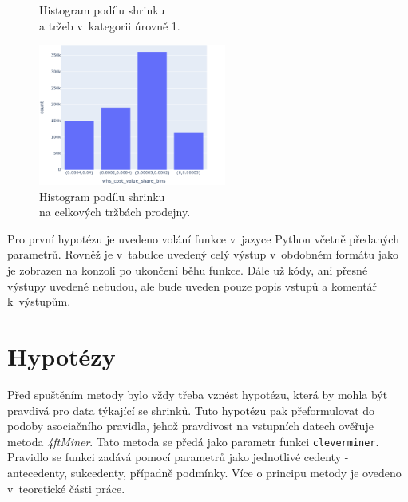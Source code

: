 \begin{figure}[h!]
\begin{minipage}[b]{.55\textwidth}
        \vspace*{-3em}
        \caption{Histogram podílu shrinku \\a tržeb v~kategorii úrovně 1.}
        \label{obr:nb:hist4}
    \end{minipage}     
       \vspace*{-1em}
\end{figure}

\begin{figure}[h!]
        \centering
        \captionsetup{justification=centering}
        \includegraphics[width=0.55\textwidth]{obrazky/grafy/histogram/newplot(4).png}
        \caption{Histogram podílu shrinku \\na celkových tržbách prodejny.}
        \label{obr:nb:hist5}
        \vspace*{-1em}
\end{figure}

Pro první hypotézu je uvedeno volání funkce v~jazyce Python včetně předaných parametrů. Rovněž je v~tabulce uvedený celý výstup v~obdobném formátu jako je zobrazen na konzoli po ukončení běhu funkce. Dále už kódy, ani přesné výstupy uvedené nebudou, ale bude uveden pouze popis vstupů a komentář k~výstupům. 

\section{Hypotézy}

Před spuštěním metody bylo vždy třeba vznést hypotézu, která by mohla být pravdivá pro data týkající se shrinků. Tuto hypotézu pak přeformulovat do podoby asociačního pravidla, jehož pravdivost  na vstupních datech ověřuje metoda \emph{4ftMiner}. Tato metoda se předá jako parametr funkci \texttt{cleverminer}. Pravidlo se funkci zadává pomocí parametrů jako jednotlivé cedenty - antecedenty, sukcedenty, případně podmínky. Více o principu metody je ovedeno v~teoretické části práce.

\vspace*{1em}

